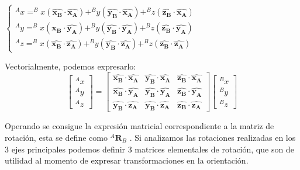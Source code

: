 $
    \begin{cases}
        ^{A}x = ^{B}x(\boldsymbol{\hat{x_B}} \cdot \boldsymbol{\hat{x_A}})  +
        ^{B}y(\boldsymbol{\hat{y_B}} \cdot
        \boldsymbol{\hat{x_A}})+^{B}z(\boldsymbol{\hat{z_B}} \cdot
        \boldsymbol{\hat{x_A}}) \\
        ^{A}y = ^{B}x(\boldsymbol{\hat{x_B}} \cdot \boldsymbol{\hat{y_A}})  +
        ^{B}y(\boldsymbol{\hat{y_B}} \cdot
        \boldsymbol{\hat{y_A}})+^{B}z(\boldsymbol{\hat{z_B}} \cdot
        \boldsymbol{\hat{y_A}}) \\
        ^{A}z = ^{B}x(\boldsymbol{\hat{x_B}} \cdot \boldsymbol{\hat{z_A}})  +
        ^{B}y(\boldsymbol{\hat{y_B}} \cdot
        \boldsymbol{\hat{z_A}})+^{B}z(\boldsymbol{\hat{z_B}} \cdot
        \boldsymbol{\hat{z_A}})
    \end{cases}
$

Vectorialmente, podemos expresarlo:
\begin{equation*}
    \begin{bmatrix}
        ^{A}x \\^{A}y\\^{A}z
    \end{bmatrix} =
    \begin{bmatrix}
        \boldsymbol{\hat{x_B}} \cdot \boldsymbol{\hat{x_A}} &
        \boldsymbol{\hat{y_B}} \cdot \boldsymbol{\hat{x_A}} & \boldsymbol{\hat{z_B}}
        \cdot \boldsymbol{\hat{x_A}}                                                 \\
        \boldsymbol{\hat{x_B}} \cdot \boldsymbol{\hat{y_A}} &
        \boldsymbol{\hat{y_B}} \cdot \boldsymbol{\hat{y_A}} & \boldsymbol{\hat{z_B}}
        \cdot \boldsymbol{\hat{y_A}}                                                 \\
        \boldsymbol{\hat{y_B}} \cdot \boldsymbol{\hat{z_A}} &
        \boldsymbol{\hat{y_B}} \cdot \boldsymbol{\hat{z_A}} & \boldsymbol{\hat{z_B}}
        \cdot \boldsymbol{\hat{z_A}}
    \end{bmatrix} \begin{bmatrix}
        ^{B}x \\  ^{B}y \\ ^{B}z
    \end{bmatrix}
\end{equation*}

Operando se consigue la expresión matricial correspondiente a la matriz de
rotación, esta se define como $^{A}\boldsymbol{R}_B$ \cite{siciliano_robotics_2009}. Si
analizamos las rotaciones realizadas en los 3 ejes principales podemos definir
3 matrices elementales de rotación, que son de utilidad al momento de expresar
transformaciones en la orientación.

